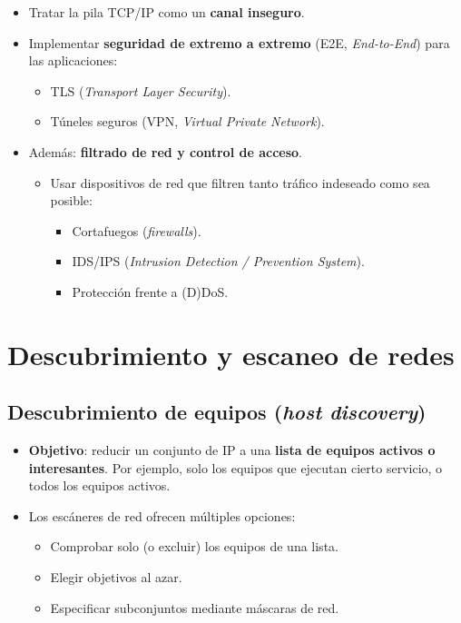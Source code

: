 \documentclass[11pt,a4paper]{report}
\begin{document}
\begin{itemize}
  \item Tratar la pila TCP/IP como un \textbf{canal inseguro}.
  \item Implementar \textbf{seguridad de extremo a extremo} (E2E, \emph{End-to-End}) para las aplicaciones:
    \begin{itemize}
      \item TLS (\emph{Transport Layer Security}).
      \item Túneles seguros (VPN, \emph{Virtual Private Network}).
    \end{itemize}
  \item Además: \textbf{filtrado de red y control de acceso}.
    \begin{itemize}
      \item Usar dispositivos de red que filtren tanto tráfico indeseado como sea posible:
        \begin{itemize}
          \item Cortafuegos (\emph{firewalls}).
          \item IDS/IPS (\emph{Intrusion Detection / Prevention System}).
          \item Protección frente a (D)DoS.
        \end{itemize}
    \end{itemize}
\end{itemize}
 
\chapter{Descubrimiento y escaneo de redes}
 
\section{Descubrimiento de equipos (\emph{host discovery})}
 
\begin{itemize}
  \item \textbf{Objetivo}: reducir un conjunto de IP a una \textbf{lista de equipos activos o interesantes}. Por ejemplo, solo los equipos que ejecutan cierto servicio, o todos los equipos activos.
  \item Los escáneres de red ofrecen múltiples opciones:
    \begin{itemize}
      \item Comprobar solo (o excluir) los equipos de una lista.
      \item Elegir objetivos al azar.
      \item Especificar subconjuntos mediante máscaras de red.
    \end{itemize}
\end{itemize}
 
\end{document}
